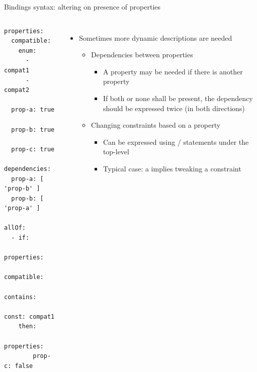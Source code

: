\begin{frame}[fragile]{Bindings syntax: altering on presence of properties}
  \begin{columns}
    \begin{block}{}
      {\fontsize{5}{6}\selectfont
\begin{verbatim}
properties:
  compatible:
    enum:
      - compat1
      - compat2

  prop-a: true

  prop-b: true

  prop-c: true

dependencies:
  prop-a: [ 'prop-b' ]
  prop-b: [ 'prop-a' ]

allOf:
  - if:
      properties:
        compatible:
          contains:
            const: compat1
    then:
      properties:
        prop-c: false
\end{verbatim}
      }
    \end{block}
    \begin{itemize}
    \item Sometimes more dynamic descriptions are needed
      \begin{itemize}
      \item Dependencies between properties
        \begin{itemize}
        \item A property may be needed if there is another property
        \item If both or none shall be present, the dependency should be
          expressed twice (in both directions)
        \end{itemize}
      \item Changing constraints based on a property
        \begin{itemize}
        \item Can be expressed using / statements
          under the top-level 
        \item Typical case: a  implies tweaking a
          constraint
        \end{itemize}
      \end{itemize}
    \end{itemize}
  \end{columns}
\end{frame}

